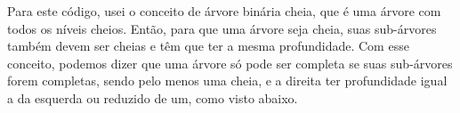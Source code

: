 Para este código, usei o conceito de árvore binária cheia, que é uma árvore com
todos os níveis cheios. Então, para que uma árvore seja cheia, suas sub-árvores
também devem ser cheias e têm que ter a mesma profundidade. Com esse conceito,
podemos dizer que uma árvore só pode ser completa se suas sub-árvores forem
completas, sendo pelo menos uma cheia, e a direita ter profundidade igual a da
esquerda ou reduzido de um, como visto abaixo.